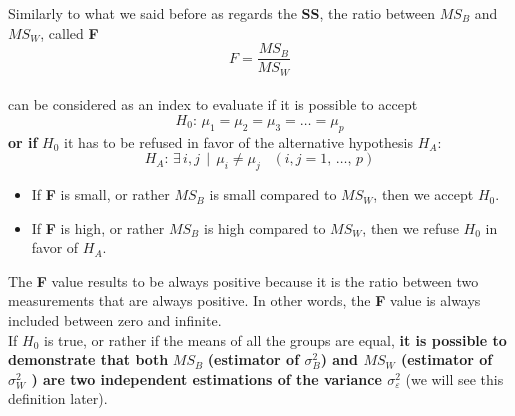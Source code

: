 \begin{frame}
  \vspace*{.25cm}
  Similarly to what we said before as regards the \textbf{SS}, the ratio between {\boldmath$MS_B$} and {\boldmath$MS_W$}, called \textbf{F} 
  $$ F = \frac{MS_B}{MS_W} $$\\
  \vspace*{.25cm}
  can be considered as an index to evaluate if it is possible to accept
  $$ H_0: \, \mu_1 = \mu_2 = \mu_3 = \dots = \mu_p $$
  \vspace*{.25cm}
  \textbf{or if} {\boldmath$H_0$} it has to be refused in favor of the alternative hypothesis {\boldmath$H_A$}:
  $$ H_A: \, \exists \, i,j \,\mid\,\mu_i\neq\mu_j\;\;\;(i,j=1,\,\dots,\,p)$$
\end{frame}

\begin{frame}
  \vspace*{.25cm}
  \begin{itemize} 
    \item If \textbf{F} is small, or rather {\boldmath$MS_B$} is small compared to {\boldmath$MS_W$}, then we accept {\boldmath$H_0$}.
    \item If \textbf{F} is high, or rather {\boldmath$MS_B$} is high compared to {\boldmath$MS_W$}, then we refuse {\boldmath$H_0$} in favor of {\boldmath$H_A$}.\\
  \end{itemize}
  \vspace*{.25cm}
  The \textbf{F} value results to be always positive because it is the ratio between two measurements that are always positive. In other words, the \textbf{F} value is always included between zero and infinite. \\
  \vspace*{.25cm}
  If {\boldmath$H_0$} is true, or rather if the means of all the groups are equal, \textbf{it is possible to demonstrate that both} {\boldmath$MS_B$} \textbf{(estimator of {\boldmath$\sigma^2_B$}) and {\boldmath$MS_W$} (estimator of {\boldmath$\sigma^2_W$} ) are two independent estimations of the variance {\boldmath$\sigma^2_{\varepsilon}$}} (we will see this definition later).
\end{frame}


